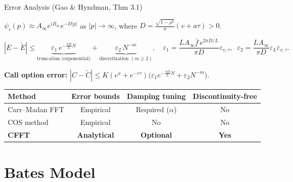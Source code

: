 \documentclass[10pt, aspectratio=169]{beamer}
\begin{document}
\begin{frame}{Error Analysis (Gao \& Hyndman, Thm 3.1)}
\begin{proposition}
$\psi_i(p) \approx A_\infty e^{iB_\infty} e^{-D|p|}$ as $|p|\to\infty$, where $D = \frac{\sqrt{1-\rho^2}}{\sigma}(v + a\tau) > 0$.
\end{proposition}

\begin{theorem}
\vspace{-4pt}
\[
  |E - \widetilde{E}| \leq \underbrace{\varepsilon_1\, e^{-\frac{\pi D}{L}N}}_{\text{truncation (exponential)}} + \underbrace{\varepsilon_2\, N^{-m}}_{\text{discretization } (m\geq 2)}, \quad
  \varepsilon_1 = \frac{LA_\infty \bar{f}\,e^{2\pi D/L}}{\pi D}\varepsilon_{v,\tau}, \;\;
  \varepsilon_2 = \frac{LA_\infty}{\pi D}\varepsilon_L\varepsilon_{v,\tau}.
\]
\end{theorem}

\textbf{Call option error:} $|C - \widetilde{C}| \leq K(e^x + e^{-r\tau})\bigl(\varepsilon_1 e^{-\frac{\pi D}{L}N} + \varepsilon_2 N^{-m}\bigr)$.

\vspace{2pt}
\begin{center}
\small
\begin{tabular}{lccc}
\toprule
\textbf{Method} & \textbf{Error bounds} & \textbf{Damping tuning} & \textbf{Discontinuity-free} \\
\midrule
Carr--Madan FFT & Empirical & Required ($\alpha$) & No \\
COS method & Empirical & No & No \\
\textbf{CFFT} & \textbf{Analytical} & \textbf{Optional} & \textbf{Yes} \\
\bottomrule
\end{tabular}
\end{center}
\end{frame}

\section{Bates Model}
\end{document}
